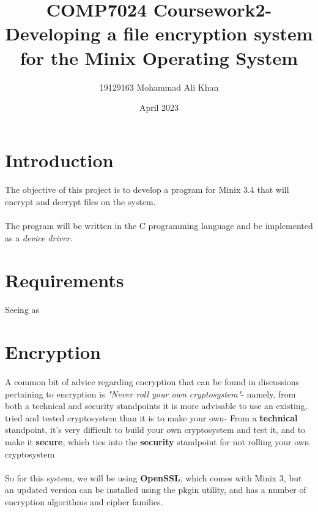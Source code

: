 \documentclass{article}
\title{COMP7024 Coursework2- Developing a file encryption system for the Minix Operating System}
\author{19129163 Mohammad Ali Khan}
\date{April 2023}
\begin{document}
\maketitle

\section{Introduction}
\paragraph{}The objective of this project is to develop a program for Minix 3.4 that will encrypt and decrypt files on the system.
\paragraph{}The program will be written in the C programming language and be implemented as a \textit{device driver}.

\section{Requirements}
\paragraph{}Seeing as 

\section{Encryption}
\paragraph{}A common bit of advice regarding encryption that can be found in discussions pertaining to encryption is \textit{"Never roll your own cryptosystem"}- namely, from both a technical and security standpoints it is more advisable to use an existing, tried and tested cryptosystem than it is to make your own- From a \textbf{technical} standpoint, it's very difficult to build your own cryptosystem and test it, and to make it \textbf{secure}, which ties into the \textbf{security} standpoint for not rolling your own cryptosystem

\paragraph{}So for this system, we will be using \textbf{OpenSSL}, which comes with Minix 3, but an updated version can be installed using the pkgin utility, and has a  number of encryption algorithms and cipher families.
\end{document}

